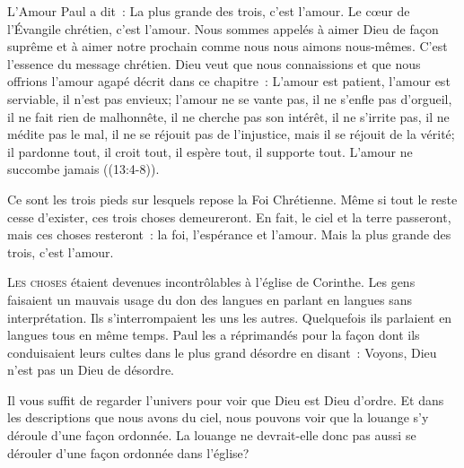L'Amour \ocadr Paul a dit~: 
 \og La plus grande des trois, c'est l'amour. \fg{}
 Le c\oe{}ur de l'Évangile chrétien, c'est l'amour.
 Nous sommes appelés à aimer Dieu de façon suprême
 et à aimer notre prochain comme nous nous aimons nous-mêmes.
 C'est l'essence du message chrétien.
 Dieu veut que nous connaissions et que nous offrions
 l'amour \og agapé \fg{} décrit dans ce chapitre~:
 \og L'amour est patient, l'amour est serviable,
 il n'est pas envieux; l'amour ne se vante pas,
 il ne s'enfle pas d'orgueil, il ne fait rien de malhonnête,
 il ne cherche pas son intérêt, il ne s'irrite pas,
 il ne médite pas le mal, il ne se réjouit pas de l'injustice,
 mais il se réjouit de la vérité;
 il pardonne tout, il croit tout, il espère tout,
 il supporte tout. L'amour ne succombe jamais \fg{}
 ((13:4-8)). 

Ce sont les trois pieds sur lesquels repose la Foi Chrétienne. 
 Même si tout le reste cesse d'exister, ces trois choses demeureront.
 En fait, le ciel et la terre passeront, mais ces choses resteront~:
 la foi, l'espérance et l'amour.
 Mais la plus grande des trois, c'est l'amour.

\dvrule






\lettrine{L}{es choses} étaient devenues incontrôlables
 à l'église de Corinthe.
 Les gens faisaient un mauvais usage du don des langues
 en parlant en langues sans interprétation.
 Ils s'interrompaient les uns les autres.
 Quelquefois ils parlaient en langues tous en même temps.
 Paul les a réprimandés pour la façon dont ils conduisaient
 leurs cultes dans le plus grand désordre en disant~: 
 \og Voyons, Dieu n'est pas un Dieu de désordre. \fg{}

Il vous suffit de regarder l'univers
 pour voir que Dieu est Dieu d'ordre.
 Et dans les descriptions que nous avons du ciel,
 nous pouvons voir que la louange s'y déroule d'une façon ordonnée.
 La louange ne devrait-elle donc pas aussi se dérouler
 d'une façon ordonnée dans l'église?

